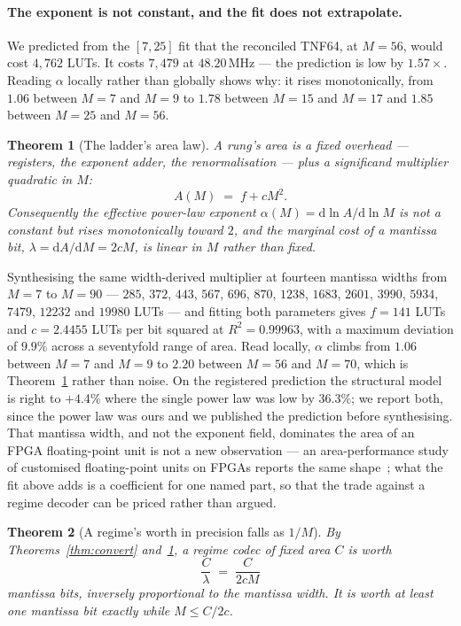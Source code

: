 \documentclass[11pt]{article}
\newtheorem{theorem}{Theorem}
\theoremstyle{definition}
\begin{document}
\paragraph{The exponent is not constant, and the fit does not extrapolate.} We
predicted from the $[7,25]$ fit that the reconciled TNF64, at $M = 56$, would
cost $4{,}762$ LUTs. It costs $7{,}479$ at $48.20$\,MHz --- the prediction is low
by $1.57\times$. Reading $\alpha$ locally rather than globally shows why: it rises
monotonically, from $1.06$ between $M{=}7$ and $M{=}9$ to $1.78$ between $M{=}15$
and $M{=}17$ and $1.85$ between $M{=}25$ and $M{=}56$.

\begin{theorem}[The ladder's area law]
\label{thm:alpha}
A rung's area is a fixed overhead --- registers, the exponent adder, the
renormalisation --- plus a significand multiplier quadratic in $M$:
\[
A(M) \;=\; f + cM^{2}.
\]
Consequently the effective power-law exponent
$\alpha(M) = \mathrm{d}\ln A/\mathrm{d}\ln M$ is not a constant but rises
monotonically toward $2$, and the marginal cost of a mantissa bit,
$\lambda = \mathrm{d}A/\mathrm{d}M = 2cM$, is \emph{linear} in $M$ rather than
fixed.
\end{theorem}

Synthesising the same width-derived multiplier at fourteen mantissa widths from
$M{=}7$ to $M{=}90$ --- $285$, $372$, $443$, $567$, $696$, $870$, $1238$, $1683$,
$2601$, $3990$, $5934$, $7479$, $12232$ and $19980$ LUTs --- and fitting both
parameters gives $f = 141$ LUTs and $c = 2.4455$ LUTs per bit squared at
$R^2 = 0.99963$, with a maximum deviation of $9.9\%$ across a seventyfold range of
area. Read locally, $\alpha$ climbs from $1.06$ between $M{=}7$ and $M{=}9$ to
$2.20$ between $M{=}56$ and $M{=}70$, which is Theorem~\ref{thm:alpha} rather than
noise. On the registered prediction the structural model is right to $+4.4\%$
where the single power law was low by $36.3\%$; we report both, since the power
law was ours and we published the prediction before synthesising. That mantissa
width, and not the exponent field, dominates the area of an FPGA floating-point
unit is not a new observation --- an area-performance study of customised
floating-point units on FPGAs reports the same shape~\cite{echeverria2011customizing};
what the fit above adds is a coefficient for one named part, so that the trade
against a regime decoder can be priced rather than argued.

\begin{theorem}[A regime's worth in precision falls as $1/M$]
\label{thm:oneoverm}
By Theorems~\ref{thm:convert} and~\ref{thm:alpha}, a regime codec of fixed area
$C$ is worth
\[
\frac{C}{\lambda} \;=\; \frac{C}{2cM}
\]
mantissa bits, inversely proportional to the mantissa width. It is worth at least
one mantissa bit exactly while $M \leq C/2c$.
\end{theorem}
\end{document}

